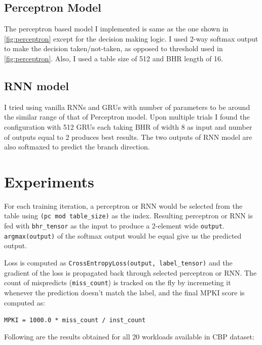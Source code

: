\documentclass{article}
\begin{document}
\subsection{Perceptron Model}
The perceptron based model I implemented is same as the one shown in \ref{fig:perceptron} except for the decision making logic. I used 2-way softmax output to make the decision taken/not-taken, as opposed to threshold used in \ref{fig:perceptron}. Also, I used a table size of 512 and BHR length of 16.

\subsection{RNN model}
I tried using vanilla RNNs and GRUs with number of parameters to be around the similar range of that of Perceptron model. Upon multiple trials I found the configuration with 512 GRUs each taking BHR of width 8 as input and number of outputs equal to 2 produces best results. The two outputs of RNN model are also softmaxed to predict the branch direction.

\section{Experiments}
For each training iteration, a perceptron or RNN would be selected from the table using \verb+(pc mod table_size)+ as the index. Resulting perceptron or RNN is fed with \verb+bhr_tensor+ as the input to produce a 2-element wide \verb+output+. \verb+argmax(output)+ of the softmax output would be equal give us the predicted output. 

Loss is computed as \verb+CrossEntropyLoss(output, label_tensor)+ and the gradient of the loss is propagated back through selected perceptron or RNN. The count of mispredicts (\verb+miss_count+) is tracked on the fly by incremeting it whenever the prediction doesn't match the label, and the final MPKI score is computed as:

\begin{center}{\verb+MPKI = 1000.0 * miss_count / inst_count+}\end{center}

Following are the results obtained for all 20 workloads available in CBP dataset:
\end{document}
